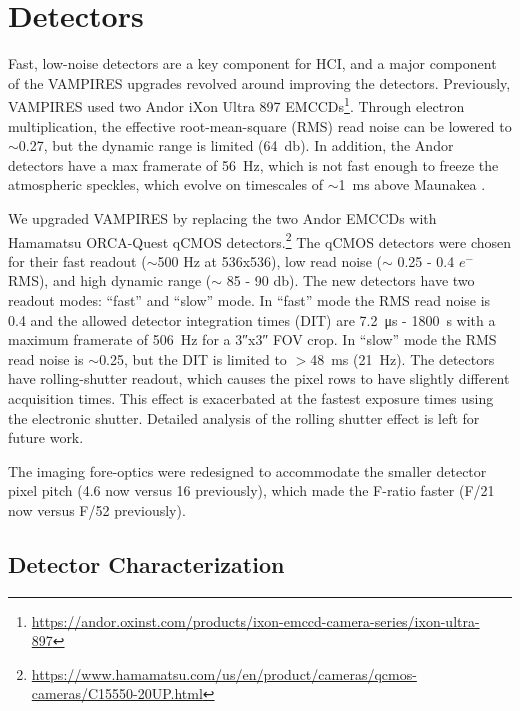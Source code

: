 \section{Detectors}\label{sec:detectors}

Fast, low-noise detectors are a key component for HCI, and a major component of the VAMPIRES upgrades revolved around improving the detectors. Previously, VAMPIRES used two Andor iXon Ultra 897 EMCCDs\footnote{\url{https://andor.oxinst.com/products/ixon-emccd-camera-series/ixon-ultra-897}}. Through electron multiplication, the effective root-mean-square (RMS) read noise can be lowered to $\sim$\SI{0.27}{\electron}, but the dynamic range is limited (\SI{64}{\decibel}). In addition, the Andor detectors have a max framerate of \SI{56}{\hertz}, which is not fast enough to freeze the atmospheric speckles, which evolve on timescales of $\sim$\SI{1}{\milli\second} above Maunakea \citep{kooten_climate_2022}. 

We upgraded VAMPIRES by replacing the two Andor EMCCDs with Hamamatsu ORCA-Quest qCMOS detectors.\footnote{\url{https://www.hamamatsu.com/us/en/product/cameras/qcmos-cameras/C15550-20UP.html}} The qCMOS detectors were chosen for their fast readout ($\sim$500 Hz at 536x536), low read noise ($\sim$ 0.25 - 0.4 $e^-$ RMS), and high dynamic range ($\sim$ 85 - 90 \si{\decibel}). The new detectors have two readout modes: ``fast'' and ``slow'' mode. In ``fast'' mode the RMS read noise is \SI{0.4}{\electron} and the allowed detector integration times (DIT) are \SI{7.2}{\micro\second} - \SI{1800}{\second} with a maximum framerate of \SI{506}{\hertz} for a \ang{;;3}x\ang{;;3} FOV crop. In ``slow'' mode the RMS read noise is $\sim$\SI{0.25}{\electron}, but the DIT is limited to $>$\SI{48}{\milli\second} (\SI{21}{\hertz}). The detectors have rolling-shutter readout, which causes the pixel rows to have slightly different acquisition times. This effect is exacerbated at the fastest exposure times using the electronic shutter. Detailed analysis of the rolling shutter effect is left for future work.

The imaging fore-optics were redesigned to accommodate the smaller detector pixel pitch (\SI{4.6}{\micron} now versus \SI{16}{\micron} previously), which made the F-ratio faster (F/21 now versus F/52 previously).

\subsection{Detector Characterization}

